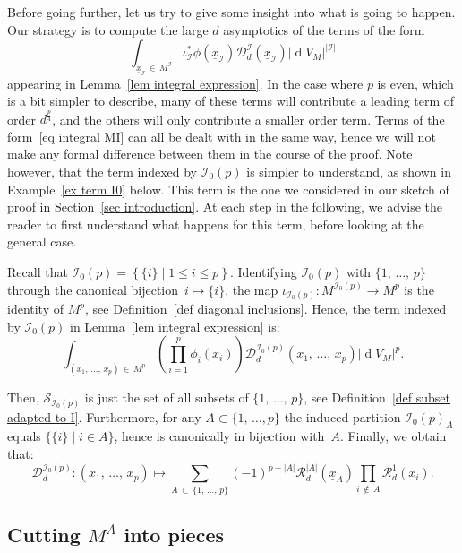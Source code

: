 \documentclass[AHL,Unicode,longabstracts,published]{cedram}
\DeclareMathOperator{\dmesure}{d}
\newcommand{\D}{\mathcal{D}}
\newcommand{\I}{\mathcal{I}}
\newcommand{\clR}{\mathcal{R}}
\newcommand{\clS}{\mathcal{S}}
\newcommand{\mvert}{\mathrel{}\middle|\mathrel{}}
\newcommand{\norm}[1]{\left\lvert #1 \right\rvert}
\newcommand{\rmes}[1]{\norm{\dmesure\! V_{#1}}}
\renewcommand{\leq}{\leqslant}
\begin{document}
Before going further, let us try to give some insight into what is going to happen. Our strategy is to compute the large $d$ asymptotics of the terms of the form
\begin{equation}\label{eq integral MI}
\int_{\underline{x}_\I\,\in\,M^\I} \iota_\I^*\phi\left(\underline{x}_\I\right) \D^\I_d(\underline{x}_\I) \rmes{M}^{\norm{\I}}
\end{equation}
appearing in Lemma~\ref{lem integral expression}. In the case where $p$ is even, which is a bit simpler to describe, many of these terms will contribute a leading term of order $d^\frac{p}{4}$, and the others will only contribute a smaller order term. Terms of the form~\eqref{eq integral MI} can all be dealt with in the same way, hence we will not make any formal difference between them in the course of the proof. Note however, that the term indexed by $\I_0(p)$ is simpler to understand, as shown in Example~\ref{ex term I0} below. This term is the one we considered in our sketch of proof in Section~\ref{sec introduction}. At each step in the following, we advise the reader to first understand what happens for this term, before looking at the general case.

\begin{exam}[Term indexed by $\I_0(p)$]\label{ex term I0}
Recall that $\I_0(p) = \left\{\{i\} \mvert 1 \leq i \leq p \right\}$. Identifying $\I_0(p)$ with $\{1,\,\dots,\,p\}$ through the canonical bijection~$i \mapsto \{i\}$, the map $\iota_{\I_0(p)}:M^{\I_0(p)} \to M^p$ is the identity of $M^p$, see Definition~\ref{def diagonal inclusions}. Hence, the term indexed by $\I_0(p)$ in Lemma~\ref{lem integral expression} is:
\[
\int_{\left(x_1,\,\dots,\,x_p\right)\,\in\,M^p} \left(\prod_{i=1}^p\phi_i(x_i)\right) \D_d^{\I_0(p)}\left(x_1,\,\dots,\,x_p\right) \rmes{M}^p.
\]

Then, $\clS_{\I_0(p)}$ is just the set of all subsets of $\{1,\,\dots,\,p\}$, see Definition~\ref{def subset adapted to I}. Furthermore, for any $A \subset \{1,\,\dots,p\}$ the induced partition $\I_0(p)_A$ equals $\{\{i\} \mid i \in A\}$, hence is canonically in bijection with~$A$. Finally, we obtain that:
\[
\D_d^{\I_0(p)} : (x_1,\,\dots,\,x_p) \longmapsto \sum_{A\,\subset\,\{1,\,\dots,\,p\}} (-1)^{p-\norm{A}} \clR_d^{\norm{A}}(\underline{x}_A) \prod_{i\,\notin\,A} \clR^1_d(x_i).
\]
\end{exam}



\subsection{Cutting \texorpdfstring{$M^A$}{} into pieces}\label{subsec cutting MA into pieces}
\end{document}

